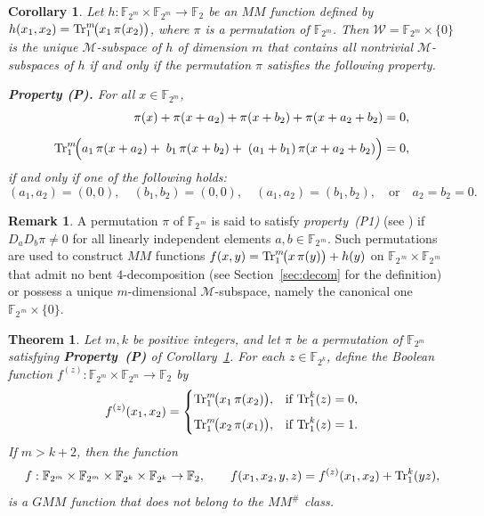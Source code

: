 \documentclass[12pt]{article}
\theoremstyle{plain}
\newtheorem{theorem}{Theorem}
\newtheorem{corollary}[lemma]{Corollary}
\theoremstyle{definition}
\newtheorem{remark}{Remark}
\renewcommand{\to}{\rightarrow}
\newcommand{\Tr}{{\rm Tr}}
\begin{document}
	\begin{corollary}\label{cor:char}
		Let
		\(h:\mathbb{F}_{2^m}\times \mathbb{F}_{2^m}\to \mathbb{F}_{2}\)
		be an \(MM\) function defined by $h(x_1,x_2)=\Tr_{1}^{m}\!\bigl(x_1\,\pi(x_2)\bigr)$,
		where \(\pi\) is a permutation of \(\mathbb{F}_{2^m}\).
		Then $ \mathcal{W} =\mathbb{F}_{2^m} \times \{0\}$
		is the unique \(\mathcal{M}\)-subspace of \(h\) of dimension \(m\) that contains
		all nontrivial \(\mathcal{M}\)-subspaces of \(h\) if and only if the permutation
		\(\pi\) satisfies the following property.
		
		\medskip
		\noindent\textbf{Property (P).}
		For all \(x \in \mathbb{F}_{2^m}\),
		\begin{align}
			\pi(x)+\pi(x+a_{2})+\pi(x+b_{2})+\pi(x+a_{2}+b_{2})
			&= 0, \label{eq:pi1}\\[6pt]
			\Tr_{1}^{m}\!\Bigl(
			a_{1}\,\pi(x+a_{2})
			+\;b_{1}\,\pi(x+b_{2})
			+\;(a_{1}+b_{1})\,\pi(x+a_{2}+b_{2})
			\Bigr)
			&= 0, \label{eq:pi2}
		\end{align}
		if and only if one of the following holds:
		\[
		(a_1,a_2)=(0,0), \quad
		(b_1,b_2)=(0,0), \quad
		(a_1,a_2)=(b_1,b_2), \quad
		\text{or} \quad a_2=b_2=0.
		\]
	\end{corollary}
	
	\begin{remark}
		A permutation $\pi$ of $\mathbb{F}_{2^{\,m}}$ is said to satisfy
		\emph{property~(P1)} (see \cite{CaCha,PaPoKuZ}) if
		$D_a D_b \pi \neq 0$ for all linearly independent elements
		$a,b \in \mathbb{F}_{2^{\,m}}$.
		Such permutations are used to construct $MM$ functions $f(x,y)=\Tr_{1}^{m}\!\bigl(x\,\pi(y)\bigr)+h(y)$
		on $\mathbb{F}_{2^{\,m}} \times \mathbb{F}_{2^{\,m}}$ that admit no bent
		$4$-decomposition (see Section~\ref{sec:decom} for the definition) or possess a unique
		$m$-dimensional $\mathcal{M}$-subspace, namely the canonical one
		$\mathbb{F}_{2^{\,m}} \times \{0\}$.
	\end{remark}
	
	\begin{theorem}\label{thm:ex}
		Let \(m,k\) be positive integers, and let \(\pi\) be a permutation of
		\(\mathbb{F}_{2^m}\) satisfying \textbf{Property~(P)}
		of Corollary~\ref{cor:char}.
		For each \(z \in \mathbb{F}_{2^k}\), define the Boolean function
		\(f^{(z)} : \mathbb{F}_{2^m} \times \mathbb{F}_{2^m} \to \mathbb{F}_2\) by
		\[
		f^{(z)}(x_1,x_2)=
		\begin{cases}
		\Tr_1^m\!\bigl(x_1\,\pi(x_2)\bigr), & \text{if } \Tr_1^k(z)=0, \\[6pt]
		\Tr_1^m\!\bigl(x_2\,\pi(x_1)\bigr), & \text{if } \Tr_1^k(z)=1.
		\end{cases}
		\]
		If \(m > k+2\), then the function
		\[
		f :
		\mathbb{F}_{2^m} \times \mathbb{F}_{2^m} \times
		\mathbb{F}_{2^k} \times \mathbb{F}_{2^k}
		\rightarrow \mathbb{F}_2,
		\qquad
		f(x_1,x_2,y,z)
		= f^{(z)}(x_1,x_2) + \Tr_1^k(yz),
		\]
		is a \(GMM\) function that does not belong to the \(MM^{\#}\) class.
	\end{theorem}
	
\end{document}
